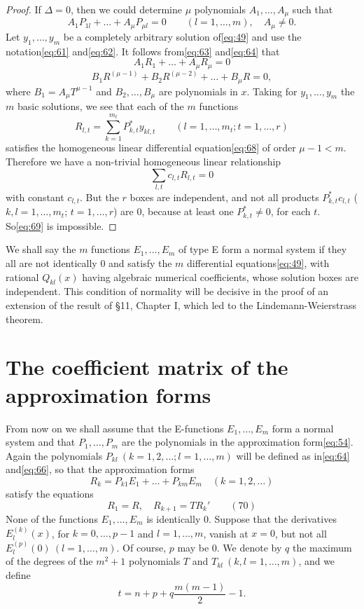\begin{proof}
If $\Delta = 0$, then we could determine $\mu$ polynomials $A_1, \dots, A_{\mu}$ such that
\[A_1 P_{1l} + \dots + A_{\mu} P_{\mu l} = 0 \qquad (l=1,\dots,m), \quad A_{\mu} \neq 0.\]
Let $y_1, \dots, y_m$ be a completely arbitrary solution of\eqref{eq:49} and use the notation\eqref{eq:61} and\eqref{eq:62}. It follows from\eqref{eq:63} and\eqref{eq:64} that
\[A_1 R_1 + \dots + A_{\mu} R_{\mu} = 0\]
\begin{equation}
B_1 R^{(\mu-1)} + B_2 R^{(\mu-2)} + \dots + B_{\mu} R = 0, \tag{68}\label{eq:68}
\end{equation}
where $B_1 = A_{\mu} T^{\mu-1}$ and $B_2, \dots, B_{\mu}$ are polynomials in $x$. Taking for $y_1, \dots, y_m$ the $m$ basic solutions, we see that each of the $m$ functions
\[R_{l,t} = \sum_{k=1}^{m_t} P_{k,t}^* y_{kl,t} \qquad (l=1,\dots,m_t; t=1,\dots,r)\]
satisfies the homogeneous linear differential equation\eqref{eq:68} of order $\mu-1 < m$. Therefore we have a non-trivial homogeneous linear relationship
\begin{equation}
\sum_{l,t} c_{l,t} R_{l,t} = 0 \tag{69}\label{eq:69}
\end{equation}
with constant $c_{l,t}$. But the $r$ boxes are independent, and not all products $P_{k,t}^* c_{l,t}$ ($k,l=1,\dots,m_t$; $t=1,\dots,r$) are 0, because at least one $P_{k,t}^* \neq 0$, for each $t$. So\eqref{eq:69} is impossible.
\end{proof}

We shall say the $m$ functions $E_1, \dots, E_m$ of type E form a normal system if they all are not identically 0 and satisfy the $m$ differential equations\eqref{eq:49}, with rational $Q_{kl}(x)$ having algebraic numerical coefficients, whose solution boxes are independent. This condition of normality will be decisive in the proof of an extension of the result of \S 11, Chapter I, which led to the Lindemann-Weierstrass theorem.

\section{The coefficient matrix of the approximation forms}

From now on we shall assume that the E-functions $E_1, \dots, E_m$ form a normal system and that $P_1, \dots, P_m$ are the polynomials in the approximation form\eqref{eq:54}. Again the polynomials $P_{kl} \ (k = 1, 2, \dots; l = 1, \dots, m)$ will be defined as in\eqref{eq:64} and\eqref{eq:66}, so that the approximation forms
\[R_{k} = P_{k1} E_{1} + \dots + P_{km}E_{m} \quad (k=1,2,\dots)\]
satisfy the equations
\begin{equation}
R_1 = R, \quad R_{k+1} = T R_k' \qquad (70)\tag{70}\label{eq:70}
\end{equation}
None of the functions $E_1, \dots, E_m$ is identically 0. Suppose that the derivatives $E_l^{(k)}(x)$, for $k = 0, \dots, p-1$ and $l = 1, \dots, m$, vanish at $x=0$, but not all $E_l^{(p)}(0) \ (l=1, \dots, m)$. Of course, $p$ may be 0. We denote by $q$ the maximum of the degrees of the $m^2+1$ polynomials $T$ and $T_{kl} \ (k, l = 1, \dots, m)$, and we define
\[t = n + p + q \frac{m(m-1)}{2} - 1.\]

